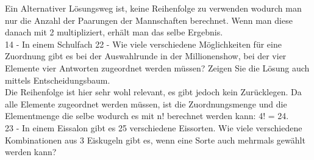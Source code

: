 \documentclass{article}
\begin{document}
	Ein Alternativer Lösungsweg ist, keine Reihenfolge zu verwenden wodurch man nur die Anzahl der Paarungen der Mannschaften berechnet. Wenn man diese danach mit 2 multipliziert, erhält man das selbe Ergebnis. \\
	14 - In einem Schulfach
	22 - Wie viele verschiedene Möglichkeiten für eine Zuordnung gibt es bei der Auswahlrunde in der Millionenshow, bei der vier Elemente vier Antworten zugeordnet werden müssen? Zeigen Sie die Lösung auch mittels Entscheidungsbaum. \\
	Die Reihenfolge ist hier sehr wohl relevant, es gibt jedoch kein Zurücklegen. Da alle Elemente zugeordnet werden müssen, ist die Zuordnungsmenge und die Elementmenge die selbe wodurch es mit n! berechnet werden kann: 4! = 24. \\
	23 - In einem Eissalon gibt es 25 verschiedene Eissorten. Wie viele verschiedene Kombinationen aus 3 Eiskugeln gibt es, wenn eine Sorte auch mehrmals gewählt werden kann? \\
\end{document}
